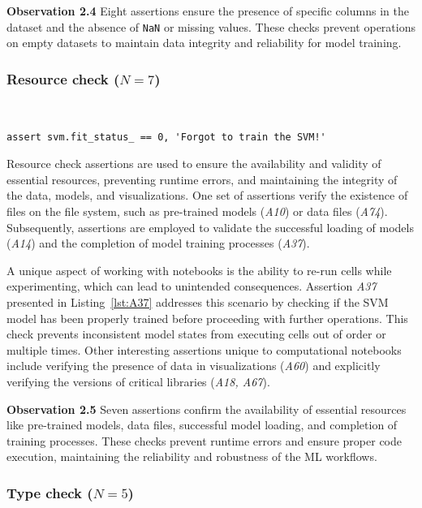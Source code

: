 \documentclass[journal]{IEEEtran}       %
\newcommand{\highlight}[1]{
  \begin{framed}%
    \noindent#1
\end{framed}}
\begin{document}
\highlight{\textbf{Observation 2.4} Eight assertions ensure the
  presence of specific columns in the dataset and the absence of
  \texttt{NaN} or missing values. These checks prevent operations on
empty datasets to maintain data integrity and reliability for model training.}

\subsubsection{Resource check ($N = 7$)}~\label{sec:result-rq2-resource-check}

\begin{lstlisting}[caption={Assertion \emph{A37} used to ensure that an ML model has not reached an inconsistent state due to out-of-order or re-execution of code cells.}, label={lst:A37}]
assert svm.fit_status_ == 0, 'Forgot to train the SVM!'
\end{lstlisting}

Resource check assertions are used to ensure the availability and
validity of essential resources, preventing runtime errors, and
maintaining the integrity of the data, models, and visualizations.
One set of assertions verify the existence of files on the file
system, such as pre-trained models (\emph{A10}) or data files
(\emph{A74}). Subsequently, assertions are employed to validate the
successful loading of models (\emph{A14}) and the completion of model
training processes (\emph{A37}).

A unique aspect of working with notebooks is the ability to re-run
cells while experimenting, which can lead to unintended consequences.
Assertion \emph{A37} presented in Listing~\ref{lst:A37} addresses
this scenario by checking if the SVM model has been properly trained
before proceeding with further operations. This check prevents
inconsistent model states from executing cells out of order or
multiple times. Other interesting assertions unique to computational
notebooks include verifying the presence of data in visualizations
(\emph{A60}) and explicitly verifying the versions of critical
libraries (\emph{A18, A67}).

\highlight{\textbf{Observation 2.5} Seven assertions confirm the
  availability of essential resources like pre-trained models, data
  files, successful model loading, and completion of training
  processes. These checks prevent runtime errors and ensure proper code
execution, maintaining the reliability and robustness of the ML workflows.}

\subsubsection{Type check ($N = 5$)}
\end{document}
